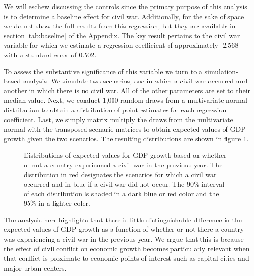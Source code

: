 
We will eschew discussing the controls since the primary purpose of this analysis is to determine a baseline effect for civil war. Additionally, for the sake of space we do not show the full results from this regression, but they are available in section \ref{tab:baseline} of the Appendix. The key result pertains to the civil war variable for which we estimate a regression coefficient of approximately -2.568 with a standard error of 0.502. 

To assess the substantive significance of this variable we turn to a simulation-based analysis. We simulate two scenarios, one in which a civil war occurred and another in which there is no civil war.  All of the other parameters are set to their median value. Next, we conduct 1,000 random draws from a multivariate normal distribution to obtain a distribution of point estimates for each regression coefficient. Last, we simply matrix multiply the draws from the multivariate normal with the transposed scenario matrices to obtain expected values of GDP growth given the two scenarios. The resulting distributions are shown in figure \ref{fig:civWarEffect}. 

\begin{figure}
	\centering
	\resizebox{.45\textwidth}{!}{}
	\caption{Distributions of expected values for GDP growth based on whether or not a country experienced a civil war in the previous year. The distribution in red designates the scenarios for which a civil war occurred and in blue if a civil war did not occur. The 90\% interval of each distribution is shaded in a dark blue or red color and the 95\% in a lighter color.}
	\label{fig:civWarEffect}	
\end{figure}
\FloatBarrier

The analysis here highlights that there is little distinguishable difference in the expected values of GDP growth as a function of whether or not there a country was experiencing a civil war in the previous year. We argue that this is because the effect of civil conflict on economic growth becomes particularly relevant when that conflict is proximate to economic points of interest such as capital cities and major urban centers.

